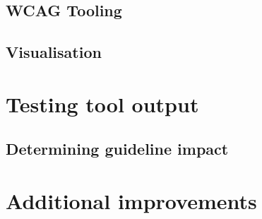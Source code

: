 \subsection{WCAG Tooling}

\subsection{Visualisation}

\section{Testing tool output}

\subsection{Determining guideline impact}

\section{Additional improvements}